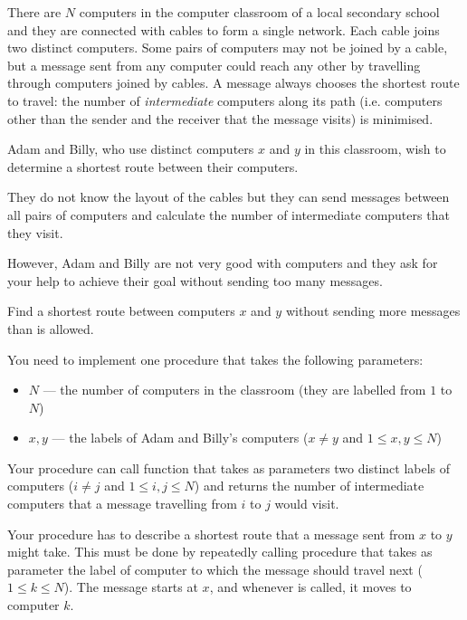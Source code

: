 \documentclass{boi2014}
\begin{document}
    There are $N$ computers in the computer classroom of a local
    secondary school and they are connected with cables to form
    a single network. Each cable joins two distinct computers.
    Some pairs of computers may not be joined by a
    cable, but a message sent from any computer could reach
    any other by travelling through computers joined by cables.
    A message always chooses the shortest route to travel:
    the number of \emph{intermediate} computers along its path
    (i.e. computers other than the sender and the receiver that
    the message visits) is minimised.
    
    Adam and Billy, who use distinct computers $x$ and $y$
    in this classroom, wish to determine a shortest route
    between their computers.

    They do not know the layout of the cables but they can
    send messages between all pairs of computers and calculate
    the number of intermediate computers that they visit.

    However, Adam and Billy are not very good with computers
    and they ask for your help to achieve their goal without sending
    too many messages.

    \Task
    Find a shortest route between computers $x$ and $y$ without
    sending more messages than is allowed.

    \Implementation
    You need to implement one procedure  that
    takes the following parameters:

    \begin{itemize}
        \item $N$ --- the number of computers in the classroom
            (they are labelled from $1$ to $N$)
        \item $x, y$ --- the labels of Adam and Billy's computers
            ($x \neq y$ and $1 \le x, y \le N$)
    \end{itemize}

    Your procedure  can call function 
    that takes as parameters two distinct labels of computers
    ($i \neq j$ and $1 \le i, j \le N$) and returns the number of intermediate computers
    that a message travelling from $i$ to $j$ would visit.

    Your procedure  has to describe a shortest route
    that a message sent from $x$ to $y$ might take. This must be done by
    repeatedly calling procedure  that takes as
    parameter the label of computer to which the message should travel
    next ($1 \le k \le N$). The message starts at $x$, and whenever
     is called, it moves to computer $k$.
\end{document}
